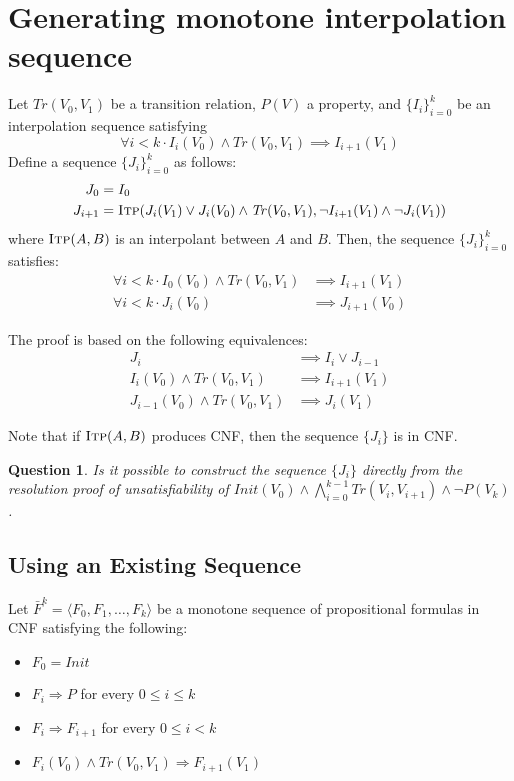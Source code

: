 \documentclass{article}
\newtheorem{question}{Question}
\newcommand{\itp}{\textsc{Itp}}
\newcommand{\Tr}{\mathit{Tr}}
\newcommand{\Init}{\mathit{Init}}
\newcommand{\setof}[1]{\{#1\}}
\begin{document}
\section{Generating monotone interpolation sequence}

Let $\Tr(V_0, V_1)$ be a transition relation, $P(V)$ a property, and $\setof{I_i}_{i=0}^k$ be
an interpolation sequence satisfying
\begin{equation}
  \forall i < k \cdot I_i(V_0) \land \Tr(V_0, V_1) \implies I_{i+1}(V_1)
\end{equation}
Define a sequence $\setof{J_i}_{i=0}^{k}$ as follows:
\begin{align}
  J_0 &= I_0\\
  J_{i+1} &= \itp (J_i(V_1) \lor J_i(V_0) \land \Tr(V_0,V_1),
  \neg I_{i+1}(V_1) \land \neg J_i(V_1))
\end{align}
where $\itp(A,B)$ is an interpolant between $A$ and $B$. Then, the
sequence $\setof{J_i}_{i=0}^k$ satisfies:
\begin{align}
  \forall i < k \cdot I_0(V_0) \land \Tr(V_0, V_1) &\implies
  I_{i+1}(V_1)\\
  \forall i < k \cdot J_i(V_0) &\implies J_{i+1}(V_0)
\end{align}

The proof is based on the following equivalences:
\begin{align}
  J_i &\implies I_i \lor J_{i-1}\\
  I_i(V_0) \land \Tr(V_0,V_1) &\implies I_{i+1}(V_1)\\
  J_{i-1}(V_0) \land \Tr(V_0,V_1) &\implies J_i(V_1)
\end{align}

Note that if $\itp(A,B)$ produces CNF, then the sequence $\setof{J_i}$ is in
CNF.

\begin{question} Is it possible to construct the sequence $\setof{J_i}$
  directly from the resolution proof of unsatisfiability of
  $\Init(V_0)\land\bigwedge_{i=0}^{k-1} \Tr(V_i,V_{i+1})\land\neg P(V_k)$.
\end{question}

\subsection{Using an Existing Sequence}

Let $\bar{F}^k = \langle F_0, F_1,\ldots, F_k\rangle$ be a monotone sequence of propositional formulas in CNF satisfying the following:
\begin{itemize}
	\item $F_0 = \Init$
	\item $F_i\Rightarrow P$ for every $0\leq i\leq k$
	\item $F_i \Rightarrow F_{i+1}$ for every $0\leq i < k$
	\item $F_i(V_0)\land\Tr(V_0,V_1)\Rightarrow F_{i+1}(V_1)$
\end{itemize}
\end{document}
